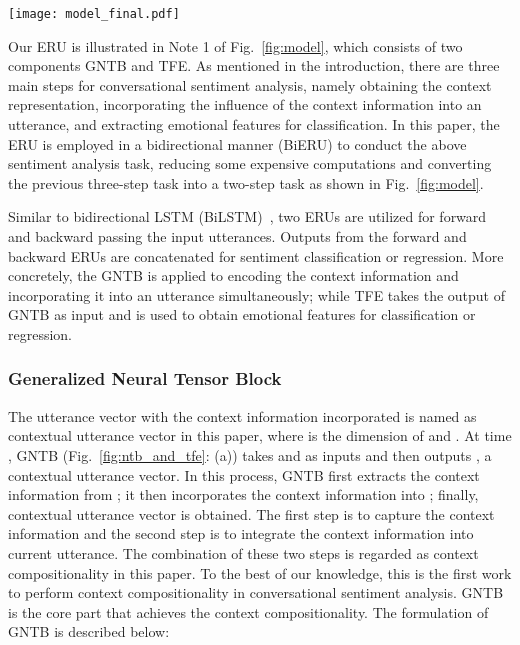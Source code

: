 \documentclass[journal]{IEEEtran}
\begin{document}
\begin{figure*}[tp]
\centering\texttt{[image: model\_final.pdf]}
\caption{(a) Architecture of BiERU with global context. (b) Architecture of BiERU with local context. Here , , and  are forward contextual utterance vector, TFE, and GNTB, respectively.  and  stand for backward contextual utterance vector and ERU, respectively.  is the predicted possibility vector of sentiment labels. T refers to textual modality in this paper. In our model, we only focus on textual modality. The detailed structures of GNTB and TFE are shown in Fig.~\ref{fig:ntb_and_tfe}.}
\label{fig:model}
\end{figure*}
Our ERU is illustrated in Note 1 of Fig.~\ref{fig:model}, which consists of two components GNTB and TFE. As mentioned in the introduction, there are three main steps for conversational sentiment analysis, namely obtaining the context representation, incorporating the influence of the context information into an utterance, and extracting emotional features for classification. In this paper, the ERU is employed in a bidirectional manner (BiERU) to conduct the above sentiment analysis task, reducing some expensive computations and converting the previous three-step task into a two-step task as shown in Fig.~\ref{fig:model}.

Similar to bidirectional LSTM (BiLSTM)~\cite{graves2005framewise}, two ERUs are utilized for forward and backward passing the input utterances. Outputs from the forward and backward ERUs are concatenated for sentiment classification or regression. More concretely, the GNTB is applied to encoding the context information and incorporating it into an utterance simultaneously; while TFE takes the output of GNTB as input and is used to obtain emotional features for classification or regression.


\subsubsection{Generalized Neural Tensor Block}
The utterance vector  with the context information incorporated is named as contextual utterance vector  in this paper, where  is the dimension of  and . At time , GNTB (Fig.~\ref{fig:ntb_and_tfe}: (a)) takes  and  as inputs and then outputs , a contextual utterance vector. In this process, GNTB first extracts the context information from ; it then incorporates the context information into ; finally, contextual utterance vector  is obtained. The first step is to capture the context information and the second step is to integrate the context information into current utterance. The combination of these two steps is regarded as context compositionality in this paper. To the best of our knowledge, this is the first work to perform context compositionality in conversational sentiment analysis. GNTB is the core part that achieves the context compositionality. The formulation of GNTB is described below:
\end{document}
